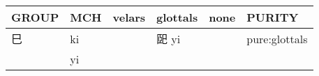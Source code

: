 \documentclass[14pt,a4paper]{scrartcl}
\begin{document}
\begin{longtable}[c]{@{}llllll@{}}
\toprule
\begin{minipage}[b]{0.14\columnwidth}\raggedright\strut
GROUP
\strut\end{minipage} &
\begin{minipage}[b]{0.14\columnwidth}\raggedright\strut
MCH
\strut\end{minipage} &
\begin{minipage}[b]{0.14\columnwidth}\raggedright\strut
velars
\strut\end{minipage} &
\begin{minipage}[b]{0.14\columnwidth}\raggedright\strut
glottals
\strut\end{minipage} &
\begin{minipage}[b]{0.14\columnwidth}\raggedright\strut
none
\strut\end{minipage} &
\begin{minipage}[b]{0.14\columnwidth}\raggedright\strut
PURITY
\strut\end{minipage}\tabularnewline
\midrule
\endhead
\begin{minipage}[t]{0.14\columnwidth}\raggedright\strut
巳
\strut\end{minipage} &
\begin{minipage}[t]{0.14\columnwidth}\raggedright\strut
ki
\strut\end{minipage} &
\begin{minipage}[t]{0.14\columnwidth}\raggedright\strut
\strut\end{minipage} &
\begin{minipage}[t]{0.14\columnwidth}\raggedright\strut
巸 yi
\strut\end{minipage} &
\begin{minipage}[t]{0.14\columnwidth}\raggedright\strut
\strut\end{minipage} &
\begin{minipage}[t]{0.14\columnwidth}\raggedright\strut
pure:glottals
\strut\end{minipage}\tabularnewline
\begin{minipage}[t]{0.14\columnwidth}\raggedright\strut
𦣞
\strut\end{minipage} &
\begin{minipage}[t]{0.14\columnwidth}\raggedright\strut
yi
\strut\end{minipage} &
\begin{minipage}[t]{0.14\columnwidth}\raggedright\strut
\strut\end{minipage} &
\begin{minipage}[t]{0.14\columnwidth}\raggedright\strut

\end{minipage}
\end{longtable}
\end{document}
